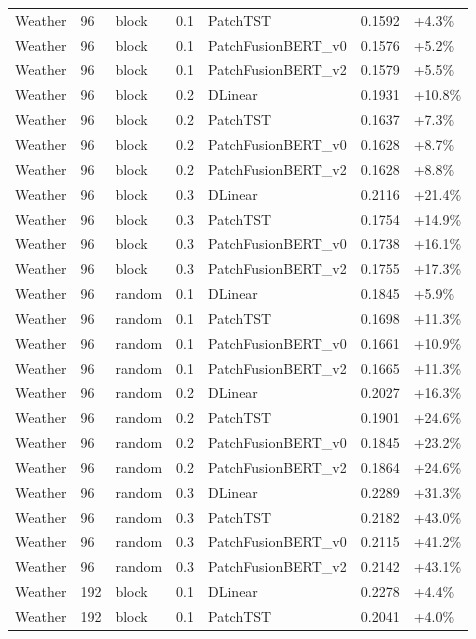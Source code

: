 \begin{tabular}{lllrlll}
Weather & 96 & block & 0.1 & PatchTST & 0.1592 & +4.3\% \\
Weather & 96 & block & 0.1 & PatchFusionBERT_v0 & 0.1576 & +5.2\% \\
Weather & 96 & block & 0.1 & PatchFusionBERT_v2 & 0.1579 & +5.5\% \\
Weather & 96 & block & 0.2 & DLinear & 0.1931 & +10.8\% \\
Weather & 96 & block & 0.2 & PatchTST & 0.1637 & +7.3\% \\
Weather & 96 & block & 0.2 & PatchFusionBERT_v0 & 0.1628 & +8.7\% \\
Weather & 96 & block & 0.2 & PatchFusionBERT_v2 & 0.1628 & +8.8\% \\
Weather & 96 & block & 0.3 & DLinear & 0.2116 & +21.4\% \\
Weather & 96 & block & 0.3 & PatchTST & 0.1754 & +14.9\% \\
Weather & 96 & block & 0.3 & PatchFusionBERT_v0 & 0.1738 & +16.1\% \\
Weather & 96 & block & 0.3 & PatchFusionBERT_v2 & 0.1755 & +17.3\% \\
Weather & 96 & random & 0.1 & DLinear & 0.1845 & +5.9\% \\
Weather & 96 & random & 0.1 & PatchTST & 0.1698 & +11.3\% \\
Weather & 96 & random & 0.1 & PatchFusionBERT_v0 & 0.1661 & +10.9\% \\
Weather & 96 & random & 0.1 & PatchFusionBERT_v2 & 0.1665 & +11.3\% \\
Weather & 96 & random & 0.2 & DLinear & 0.2027 & +16.3\% \\
Weather & 96 & random & 0.2 & PatchTST & 0.1901 & +24.6\% \\
Weather & 96 & random & 0.2 & PatchFusionBERT_v0 & 0.1845 & +23.2\% \\
Weather & 96 & random & 0.2 & PatchFusionBERT_v2 & 0.1864 & +24.6\% \\
Weather & 96 & random & 0.3 & DLinear & 0.2289 & +31.3\% \\
Weather & 96 & random & 0.3 & PatchTST & 0.2182 & +43.0\% \\
Weather & 96 & random & 0.3 & PatchFusionBERT_v0 & 0.2115 & +41.2\% \\
Weather & 96 & random & 0.3 & PatchFusionBERT_v2 & 0.2142 & +43.1\% \\
Weather & 192 & block & 0.1 & DLinear & 0.2278 & +4.4\% \\
Weather & 192 & block & 0.1 & PatchTST & 0.2041 & +4.0\% \\

\end{tabular}
